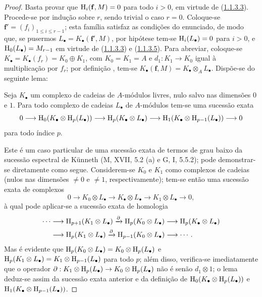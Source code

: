 \begin{proof}
Basta provar que $\mathrm{H}_i(\mathbf{f},M)=0$ para todo $i>0$, em virtude de (\hyperref[III.1.1.3.3]{1.1.3.3}).
Procede-se por indução sobre $r$, sendo trivial o caso $r=0$.
Coloque-se $\mathbf{f}'=(f_i)_{1\leq i\leq r-1}$; esta família satisfaz as condições do enunciado, de modo que, se pusermos $L_\bullet=K_\bullet(\mathbf{f}',M)$, por hipótese tem-se $\mathrm{H}_i(L_\bullet)=0$ para $i>0$, e $\mathrm{H}_0(L_\bullet)=M_{r-1}$ em virtude de (\hyperref[III.1.1.3.3]{1.1.3.3}) e (\hyperref[III.1.1.3.5]{1.1.3.5}).
Para abreviar, coloque-se $K_\bullet=K_\bullet(f_r)=K_0\oplus K_1$, com $K_0=K_1=A$ e $d_1:K_1\to K_0$ igual à multiplicação por $f_r$; por definição , tem-se $K_\bullet(\mathbf{f},M)=K_\bullet\otimes_A L_\bullet$.
Dispõe-se do seguinte lema:

\begin{lemma}[1.1.4.1]
\label{III.1.1.4.1}
Seja $K_\bullet$ um complexo de cadeias de $A$-módulos livres, nulo salvo nas dimensões $0$ e $1$.
Para todo complexo de cadeias $L_\bullet$ de $A$-módulos tem-se uma sucessão exata
\[
  0\to\HH_0(K_\bullet\otimes\HH_p(L_\bullet))\to\HH_p(K_\bullet\otimes L_\bullet)\to\HH_1(K_\bullet\otimes\HH_{p-1}(L_\bullet))\to 0
\]
para todo índice $p$.
\end{lemma}

Este é um caso particular de uma sucessão exata de termos de grau baixo da sucessão espectral de K\"unneth (M, XVII, 5.2 (a) e G, I, 5.5.2); pode demonstrar-se diretamente como segue.
Considerem-se $K_0$ e $K_1$ como complexos de cadeias (nulos nas dimensões $\neq 0$ e $\neq 1$, respectivamente); tem-se então uma sucessão exata de complexos
\[
  0\to K_0\otimes L_\bullet\to K_\bullet\otimes L_\bullet\to K_1\otimes L_\bullet\to 0,
\]
à qual pode aplicar-se a sucessão exata de homologia
\[
  \begin{aligned}
  \cdots&\to\HH_{p+1}(K_1\otimes L_\bullet)
  \xrightarrow{\partial}\HH_p(K_0\otimes L_\bullet)
  \to\HH_p(K_\bullet\otimes L_\bullet)\\
  &\to\HH_p(K_1\otimes L_\bullet)
  \xrightarrow{\partial}\HH_{p-1}(K_0\otimes L_\bullet)\to\cdots.
  \end{aligned}
\]
Mas é evidente que $\mathrm{H}_p(K_0\otimes L_\bullet)=K_0\otimes\mathrm{H}_p(L_\bullet)$ e $\mathrm{H}_p(K_1\otimes L_\bullet)=K_1\otimes\mathrm{H}_{p-1}(L_\bullet)$ para todo $p$; além disso, verifica-se imediatamente que o operador $\partial:K_1\otimes\HH_p(L_\bullet)\to K_0\otimes\HH_p(L_\bullet)$ não é senão $d_1\otimes 1$; o lema deduz-se assim da sucessão exata anterior e da definição de $\mathrm{H}_0(K_\bullet\otimes\mathrm{H}_p(L_\bullet))$ e $\mathrm{H}_1(K_\bullet\otimes\mathrm{H}_{p-1}(L_\bullet))$.


\end{proof}
